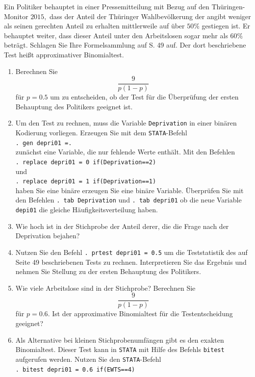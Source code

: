 \documentclass[11pt]{article}
\begin{document}
\begin{enumerate}
Ein Politiker behauptet in einer Pressemitteilung mit Bezug auf den Thüringen-Monitor $2015,$ dass der Anteil der Thüringer Wahlbevölkerung
der angibt weniger als seinen gerechten Anteil zu erhalten mittlerweile auf über $50\%$ gestiegen ist. Er behauptet weiter, dass 
dieser Anteil unter den Arbeitslosen sogar mehr als $60\%$ beträgt.
 Schlagen Sie Ihre Formelsammlung auf
S. 49 auf. Der dort beschriebene Test heißt approximativer Binomialtest.
%
\begin{enumerate}
\item{Berechnen Sie $$\frac{9}{p(1-p)}$$ für $p=0.5$ um zu entscheiden, ob der Test für die Überprüfung
der ersten Behauptung des Politikers geeignet ist.}
\item{Um den Test zu rechnen, muss die Variable 
\texttt{Deprivation} in einer binären Kodierung vorliegen. Erzeugen Sie mit dem \texttt{STATA}-Befehl \\  \texttt{. gen depri01 =.} \\
zunächst eine Variable, die nur fehlende Werte enthält. Mit den Befehlen
\\ \texttt{. replace depri01 = 0 if(Deprivation==2)}\\ und \\ \texttt{. replace depri01 = 1 if(Deprivation==1)}\\ haben Sie eine binäre
erzeugen Sie eine binäre Variable. Überprüfen Sie mit den Befehlen 
\texttt{. tab Deprivation} und \texttt{. tab depri01} ob die neue Variable \texttt{depi01}
die gleiche Häufigkeitsverteilung haben.}
\item{Wie hoch ist in der Stichprobe der Anteil derer, die die Frage nach der Deprivation bejahen?}
\item{Nutzen Sie den Befehl \texttt{. prtest depri01 = 0.5} um die Teststatistik des auf Seite 49 beschriebenen Tests zu rechnen.
Interpretieren Sie das Ergebnis und nehmen Sie Stellung zu der ersten Behauptung des Politikers.}
\item{Wie viele Arbeitslose sind in der Stichprobe? Berechnen Sie $$\frac{9}{p(1-p)}$$ für $p=0.6.$ Ist der approximative
Binomialtest für die Testentscheidung geeignet? }
\item{Als Alternative bei kleinen Stichprobenumfängen gibt es den exakten Binomialtest. Dieser Test kann in \texttt{STATA}
mit Hilfe des Befehls \texttt{bitest} aufgerufen werden. Nutzen Sie den \texttt{STATA}-Befehl \\ \texttt{. bitest depri01 = 0.6 if(EWTS==4)}\\
}
\end{enumerate}
\end{enumerate}
\end{document}
